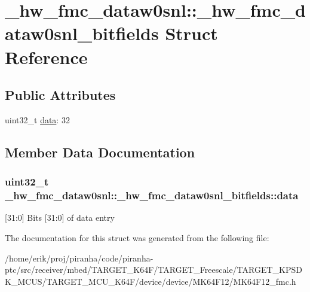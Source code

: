 \hypertarget{struct__hw__fmc__dataw0snl_1_1__hw__fmc__dataw0snl__bitfields}{}\section{\+\_\+hw\+\_\+fmc\+\_\+dataw0snl\+:\+:\+\_\+hw\+\_\+fmc\+\_\+dataw0snl\+\_\+bitfields Struct Reference}
\label{struct__hw__fmc__dataw0snl_1_1__hw__fmc__dataw0snl__bitfields}
\subsection*{Public Attributes}
\begin{DoxyCompactItemize}
\item 
uint32\+\_\+t \hyperlink{struct__hw__fmc__dataw0snl_1_1__hw__fmc__dataw0snl__bitfields_abd65916e722ef51b1ea9260a6c46bc8b}{data}\+: 32
\end{DoxyCompactItemize}


\subsection{Member Data Documentation}
\subsubsection[{\texorpdfstring{data}{data}}]{\setlength{\rightskip}{0pt plus 5cm}uint32\+\_\+t \+\_\+hw\+\_\+fmc\+\_\+dataw0snl\+::\+\_\+hw\+\_\+fmc\+\_\+dataw0snl\+\_\+bitfields\+::data}\hypertarget{struct__hw__fmc__dataw0snl_1_1__hw__fmc__dataw0snl__bitfields_abd65916e722ef51b1ea9260a6c46bc8b}{}\label{struct__hw__fmc__dataw0snl_1_1__hw__fmc__dataw0snl__bitfields_abd65916e722ef51b1ea9260a6c46bc8b}
\mbox{[}31\+:0\mbox{]} Bits \mbox{[}31\+:0\mbox{]} of data entry 

The documentation for this struct was generated from the following file\+:\begin{DoxyCompactItemize}
\item 
/home/erik/proj/piranha/code/piranha-\/ptc/src/receiver/mbed/\+T\+A\+R\+G\+E\+T\+\_\+\+K64\+F/\+T\+A\+R\+G\+E\+T\+\_\+\+Freescale/\+T\+A\+R\+G\+E\+T\+\_\+\+K\+P\+S\+D\+K\+\_\+\+M\+C\+U\+S/\+T\+A\+R\+G\+E\+T\+\_\+\+M\+C\+U\+\_\+\+K64\+F/device/device/\+M\+K64\+F12/M\+K64\+F12\+\_\+fmc.\+h\end{DoxyCompactItemize}
